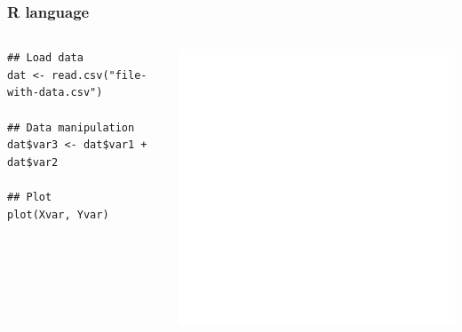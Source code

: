 \documentclass[9pt,xcolor=pdftex,dvipsnames,table]{beamer}
\begin{document}
\begin{frame}[fragile] %
\frametitle{\textbf{R language}}
\begin{columns}
\begin{example}[]
\begin{verbatim}
## Load data
dat <- read.csv("file-with-data.csv")

## Data manipulation
dat$var3 <- dat$var1 + dat$var2

## Plot
plot(Xvar, Yvar)
\end{verbatim} %
\end{example}
\vspace{1.5cm}
\includegraphics[width=1\textwidth]{images/corr.png}
\end{columns}
\end{frame}
\end{document}
